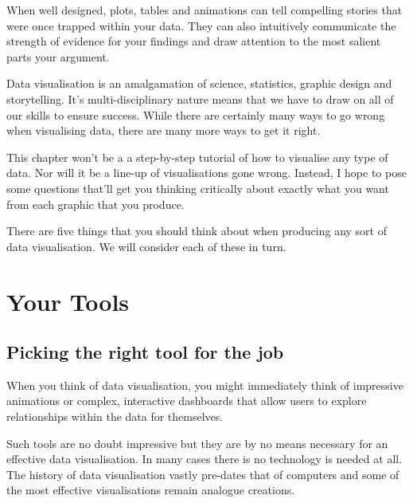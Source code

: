 \documentclass[
  12pt,
]{book}
\begin{document}
When well designed, plots, tables and animations can tell compelling stories that were once trapped within your data. They can also intuitively communicate the strength of evidence for your findings and draw attention to the most salient parts your argument.

Data visualisation is an amalgamation of science, statistics, graphic design and storytelling. It's multi-disciplinary nature means that we have to draw on all of our skills to ensure success. While there are certainly many ways to go wrong when visualising data, there are many more ways to get it right.

This chapter won't be a a step-by-step tutorial of how to visualise any type of data. Nor will it be a line-up of visualisations gone wrong. Instead, I hope to pose some questions that'll get you thinking critically about exactly what you want from each graphic that you produce.

There are five things that you should think about when producing any sort of data visualisation. We will consider each of these in turn.

\hypertarget{your-tools}{%
\section{Your Tools 🔨}\label{your-tools}}

\hypertarget{picking-the-right-tool-for-the-job}{%
\subsection{Picking the right tool for the job}\label{picking-the-right-tool-for-the-job}}

When you think of data visualisation, you might immediately think of impressive animations or complex, interactive dashboards that allow users to explore relationships within the data for themselves.

Such tools are no doubt impressive but they are by no means necessary for an effective data visualisation. In many cases there is no technology is needed at all. The history of data visualisation vastly pre-dates that of computers and some of the most effective visualisations remain analogue creations.
\end{document}
